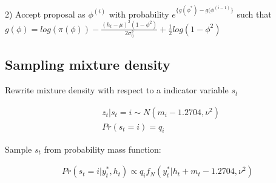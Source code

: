 \documentclass[12pt, a4paper]{article}
\begin{document}
2) Accept proposal as $\phi^{(i)}$ with probability $e^{\{g(\phi^\ast) - g(\phi^{(i-1)}\}}$ such that $g(\phi) = log (\pi (\phi)) - \frac {(h_t - \mu)^2 (1-\phi^2)}{2 \sigma_{\eta}^2} + \frac{1}{2} log (1-\phi^2)$

\subsection*{Sampling mixture density}

Rewrite mixture density with respect to a indicator variable $s_t$

$$
\begin{aligned}
&z_t | s_t = i \sim N(m_i - 1.2704, \nu^2) \\
&Pr(s_t = i) = q_i
\end{aligned}
$$

Sample $s_t$ from probability mass function: 

$$
\begin{aligned}
Pr(s_t = i | y_t^{\ast}, h_t) \propto q_i f_N(y_t^{\ast} | h_t + m_t - 1.2704, \nu^2)
\end{aligned}
$$
\end{document}
